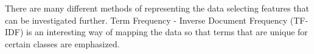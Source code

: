 \documentclass[11pt, a4paper, twocolumn]{article}
\begin{document}
There are many different methods of representing the data selecting features that can be investigated further. Term Frequency - Inverse Document Frequency (TF-IDF) is an interesting way of mapping the data so that terms that are unique for certain classes are emphasized.



\nocite{*}

\end{document}
